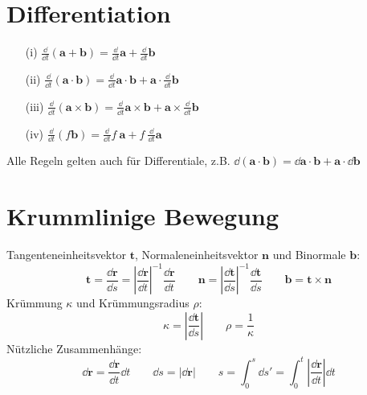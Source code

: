 
\section{Differentiation}

\begin{framedprop}
	\begin{enumerate}
		\item[(i)] $\frac{\dd}{\dd t} (\mathbf{a} + \mathbf{b}) = \frac{\dd}{\dd t} \mathbf{a} + \frac{\dd}{\dd t} \mathbf{b}$
		
		\item[(ii)] $\frac{\dd}{\dd t} (\mathbf{a} \cdot \mathbf{b}) = \frac{\dd}{\dd t} \mathbf{a} \cdot \mathbf{b} + \mathbf{a} \cdot \frac{\dd}{\dd t} \mathbf{b}$
		
		\item[(iii)] $\frac{\dd}{\dd t} (\mathbf{a} \times \mathbf{b}) = \frac{\dd}{\dd t} \mathbf{a} \times \mathbf{b} + \mathbf{a} \times \frac{\dd}{\dd t} \mathbf{b}$
		
		\item[(iv)] $\frac{\dd}{\dd t} (f \mathbf{b}) = \frac{\dd}{\dd t} f \  \mathbf{a} + f \  \frac{\dd}{\dd t} \mathbf{a}$
	\end{enumerate}

Alle Regeln gelten auch für Differentiale, z.B. $\dd (\mathbf{a} \cdot \mathbf{b}) = \dd \mathbf{a} \cdot \mathbf{b} + \mathbf{a} \cdot \dd \mathbf{b}$
\end{framedprop}

\section{Krummlinige Bewegung}

\begin{framedprop}
Tangenteneinheitsvektor $\mathbf{t}$, Normaleneinheitsvektor $\mathbf{n}$ und Binormale $\mathbf{b}$:
\[
\mathbf{t} = \frac{\dd \mathbf{r}}{\dd s} = \left|\frac{\dd \mathbf{r}}{\dd t}\right|^{-1} \frac{\dd \mathbf{r}}{\dd t}  \qquad
\mathbf{n} = \left|\frac{\dd \mathbf{t}}{\dd s}\right|^{-1} \frac{\dd \mathbf{t}}{\dd s}  \qquad
\mathbf{b} = \mathbf{t} \times \mathbf{n}
\]
Krümmung $\kappa$ und Krümmungsradius $\rho$:
\[
\kappa = \left|\frac{\dd \mathbf{t}}{\dd s}\right| \qquad \rho = \frac{1}{\kappa}
\]
Nützliche Zusammenhänge:
\[
\dd\mathbf{r} = \frac{\dd \mathbf{r}}{\dd t}\dd t \qquad \dd s = |\dd\mathbf{r}| \qquad s = \int_{0}^{s} \dd s' = \int_{0}^{t} \left| \frac{\dd \mathbf{r}}{\dd t} \right| \dd t
\]

\end{framedprop}


